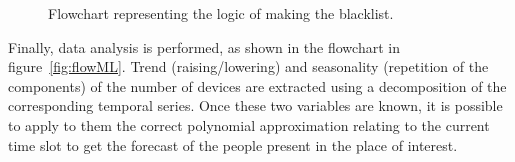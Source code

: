 \begin{figure}
\begin{minipage}[b]{8.5cm}
\caption{Flowchart representing the logic of making the blacklist.}
\label{fig:flowblacklist}
\end{minipage}
\end{figure}

Finally, data analysis is performed, as shown in the flowchart in figure~\ref{fig:flowML}. Trend (raising/lowering) and seasonality (repetition of the components) of the number of devices are extracted using a decomposition of the corresponding temporal series. Once these two variables are known, it is possible to apply to them the correct polynomial approximation relating to the current time slot to get the forecast of the people present in the place of interest.



